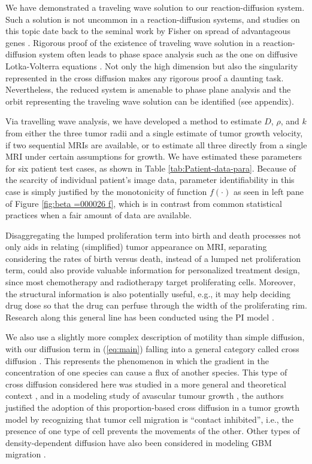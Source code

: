 \documentclass{aims}
\numberwithin{equation}{section}
\begin{document}
We have demonstrated a traveling wave solution to our reaction-diffusion system.  Such a solution is not uncommon in a reaction-diffusion systems,
and studies on this topic date back to the seminal work by Fisher on spread of advantageous genes \cite{FISHER1937}. Rigorous
proof of the existence of traveling wave solution in a reaction-diffusion
system often leads to phase space analysis such as the one on diffusive Lotka-Volterra equations \cite{Dunbar1983}.
Not only the high dimension but also the singularity represented in
the cross diffusion makes any rigorous proof a daunting task. Nevertheless,
the reduced system is amenable to phase plane analysis and the orbit representing the traveling wave solution can be identified (see appendix).

Via travelling wave analysis, we have developed a method to estimate $D$, $\rho$, and $k$ from either the three tumor radii and a single estimate of tumor growth velocity, if two sequential MRIs are available, or to estimate all three directly from a single MRI under certain assumptions for growth.  We have estimated these parameters for six patient test cases, as shown in Table \ref{tab:Patient-data-para}. Because of the scarcity of individual patient's image data, parameter identifiability in this case is simply justified by the monotonicity of function  $f(\cdot)$ as seen in left pane of Figure \ref{fig:beta =000026 f}, which is in contrast from common statistical practices \cite{Eisenberg2017} when a fair amount of data are available. 
   

Disaggregating the lumped proliferation term into birth and death processes not only aids in relating (simplified) tumor appearance on MRI, separating considering the rates of birth versus death, instead of a lumped net proliferation term, could also provide valuable information for personalized treatment
design, since most chemotherapy and radiotherapy target proliferating cells. Moreover, the structural information is also potentially useful,
e.g., it may help deciding drug dose so that the drug can perfuse through the width of the proliferating rim. Research along this general line has been conducted using the PI model \cite{Kim2017}.

We also use a slightly more complex description of motility than simple diffusion, with our diffusion term in (\ref{eq:main}) falling into a general category called cross diffusion \cite{Madzvamuse2017}.  This represents the phenomenon in which
the gradient in the concentration of one species can cause a flux
of another species. This type of cross diffusion considered here was
studied in a more general and theoretical context \cite{Sherratt2000}, and in a modeling study of avascular tumour growth \cite{Sherratt2001}, the authors justified the adoption of this
proportion-based cross diffusion in a tumor growth model by recognizing
that tumor cell migration is ``contact inhibited'', i.e., the presence
of one type of cell prevents the movements of the other. Other types of density-dependent
diffusion have also been considered in modeling GBM migration \cite{Stepien2015a}.
\end{document}
